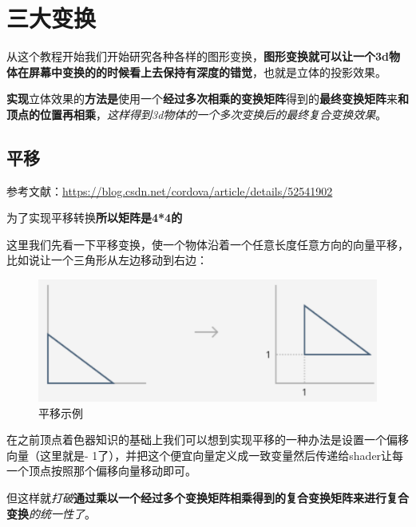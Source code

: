 \documentclass[UTF8,a4paper,8pt]{ctexbook}
\begin{document}
\chapter{三大变换}
	从这个教程开始我们开始研究各种各样的图形变换，\textbf{图形变换就可以让一个3d物体在屏幕中变换的的时候看上去保持有深度的错觉}，也就是立体的投影效果。
	
	\textbf{实现}立体效果的\textbf{方法是}使用一个\textbf{经过多次相乘的变换矩阵}得到的\textbf{最终变换矩阵}来\textbf{和顶点的位置再相乘}，\textit{这样得到3d物体的一个多次变换后的最终复合变换效果}。
	
	\section{平移}
		参考文献：\url{https://blog.csdn.net/cordova/article/details/52541902}
		
		为了实现平移转换\textbf{所以矩阵是4*4的}
		
		
		这里我们先看一下平移变换，使一个物体沿着一个任意长度任意方向的向量平移，比如说让一个三角形从左边移动到右边：
			\begin{figure}[h]
				\centering
				\includegraphics[scale = 0.4]{transfer.png}
				\caption{平移示例}
			\end{figure}

		在之前顶点着色器知识的基础上我们可以想到实现平移的一种办法是设置一个偏移向量（这里就是- 1了），并把这个便宜向量定义成一致变量然后传递给shader让每一个顶点按照那个偏移向量移动即可。
		
		但这样就\textit{打破}\textbf{通过乘以一个经过多个变换矩阵相乘得到的复合变换矩阵来进行复合变换}\textit{的统一性了}。
		 
\end{document}
